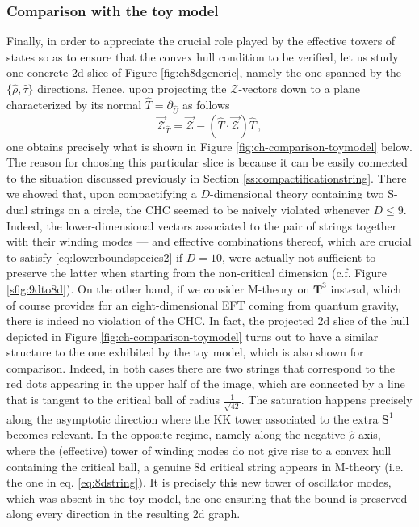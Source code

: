 \subsubsection*{Comparison with the toy model}

Finally, in order to appreciate the crucial role played by the effective towers of states so as to ensure that the convex hull condition to be verified, let us study one concrete 2d slice of Figure \ref{fig:ch8dgeneric}, namely the one spanned by the $\{\hat \rho, \hat \tau \}$ directions. Hence, upon projecting the $\mathcal{Z}$-vectors down to a plane characterized by its normal $\hat T = \partial_{\hat{U}}$ as follows
%
\begin{equation}\label{eq:2dprojection}
	\vec{\mathcal{Z}}_{\hat T} = \vec{\mathcal{Z}} - \left( \hat T \cdot \vec{\mathcal{Z}}\right) \hat T\, ,
\end{equation}
%
one obtains precisely what is shown in Figure \ref{fig:ch-comparison-toymodel} below. The reason for choosing this particular slice is because it can be easily connected to the situation discussed previously in Section \ref{ss:compactificationstring}. There we showed that, upon compactifying a $D$-dimensional theory containing two S-dual strings on a circle, the CHC seemed to be naively violated whenever $D\leq9$. Indeed, the lower-dimensional vectors associated to the pair of strings together with their winding modes --- and effective combinations thereof, which are crucial to satisfy \eqref{eq:lowerboundspecies2} if $D=10$, were actually not sufficient to preserve the latter when starting from the non-critical dimension (c.f. Figure \ref{sfig:9dto8d}). On the other hand, if we consider M-theory on $\mathbf{T}^3$ instead, which of course provides for an eight-dimensional EFT coming from quantum gravity, there is indeed no violation of the CHC. In fact, the projected 2d slice of the hull depicted in Figure \ref{fig:ch-comparison-toymodel} turns out to have a similar structure to the one exhibited by the toy model, which is also shown for comparison. Indeed, in both cases there are two strings that correspond to the red dots appearing in the upper half of the image, which are connected by a line that is tangent to the critical ball of radius $\frac{1}{\sqrt{42}}$. The saturation happens precisely along the asymptotic direction where the KK tower associated to the extra $\mathbf{S}^1$ becomes relevant. In the opposite regime, namely along the negative $\hat \rho$ axis, where the (effective) tower of winding modes do not give rise to a convex hull containing the critical ball, a genuine 8d critical string appears in M-theory (i.e. the one in eq. \eqref{eq:8dstring}). It is precisely this new tower of oscillator modes, which was absent in the toy model, the one ensuring that the bound is preserved along every direction in the resulting 2d graph.

